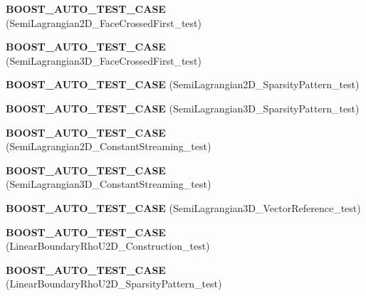 \begin{DoxyCompactItemize}
\item 
\hypertarget{namespacenatrium_aae67c7512f6343d603c5b33e0cdab798}{
{\bfseries BOOST\_\-AUTO\_\-TEST\_\-CASE} (SemiLagrangian2D\_\-FaceCrossedFirst\_\-test)}
\label{namespacenatrium_aae67c7512f6343d603c5b33e0cdab798}

\item 
\hypertarget{namespacenatrium_a3e7fdc3d43feb7b3b2907ad1318f0023}{
{\bfseries BOOST\_\-AUTO\_\-TEST\_\-CASE} (SemiLagrangian3D\_\-FaceCrossedFirst\_\-test)}
\label{namespacenatrium_a3e7fdc3d43feb7b3b2907ad1318f0023}

\item 
\hypertarget{namespacenatrium_a0ea7d35705b5510cf096509e0c04b666}{
{\bfseries BOOST\_\-AUTO\_\-TEST\_\-CASE} (SemiLagrangian2D\_\-SparsityPattern\_\-test)}
\label{namespacenatrium_a0ea7d35705b5510cf096509e0c04b666}

\item 
\hypertarget{namespacenatrium_aee9f084e377533e7051bc7ed8271526b}{
{\bfseries BOOST\_\-AUTO\_\-TEST\_\-CASE} (SemiLagrangian3D\_\-SparsityPattern\_\-test)}
\label{namespacenatrium_aee9f084e377533e7051bc7ed8271526b}

\item 
\hypertarget{namespacenatrium_a3beee955eed9ac8e01af3cc7ce514fcb}{
{\bfseries BOOST\_\-AUTO\_\-TEST\_\-CASE} (SemiLagrangian2D\_\-ConstantStreaming\_\-test)}
\label{namespacenatrium_a3beee955eed9ac8e01af3cc7ce514fcb}

\item 
\hypertarget{namespacenatrium_a068ae2506e3d7bd4b03a98d6ba57034f}{
{\bfseries BOOST\_\-AUTO\_\-TEST\_\-CASE} (SemiLagrangian3D\_\-ConstantStreaming\_\-test)}
\label{namespacenatrium_a068ae2506e3d7bd4b03a98d6ba57034f}

\item 
\hypertarget{namespacenatrium_a96d7feccacfc22412c6a16721c205a8a}{
{\bfseries BOOST\_\-AUTO\_\-TEST\_\-CASE} (SemiLagrangian3D\_\-VectorReference\_\-test)}
\label{namespacenatrium_a96d7feccacfc22412c6a16721c205a8a}

\item 
\hypertarget{namespacenatrium_a6836c174e44ff7be71d260768b06a169}{
{\bfseries BOOST\_\-AUTO\_\-TEST\_\-CASE} (LinearBoundaryRhoU2D\_\-Construction\_\-test)}
\label{namespacenatrium_a6836c174e44ff7be71d260768b06a169}

\item 
\hypertarget{namespacenatrium_acd713562ddb2d103f3d59f703be1f085}{
{\bfseries BOOST\_\-AUTO\_\-TEST\_\-CASE} (LinearBoundaryRhoU2D\_\-SparsityPattern\_\-test)}
\label{namespacenatrium_acd713562ddb2d103f3d59f703be1f085}


\end{DoxyCompactItemize}
